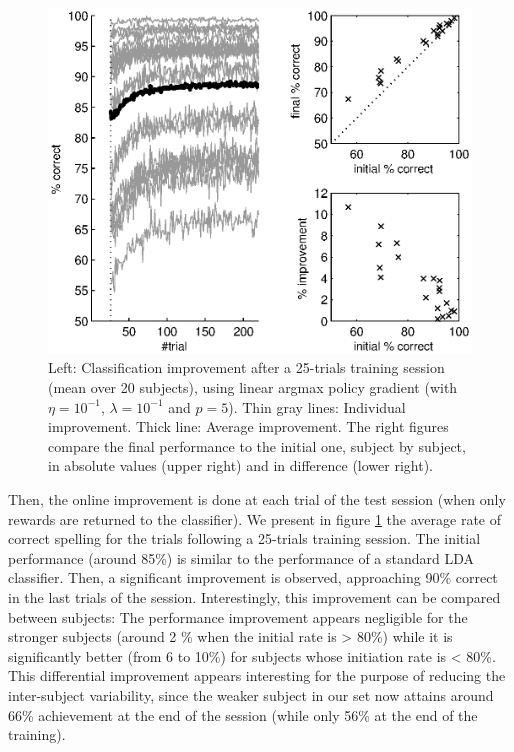 \documentclass[conference]{IEEEtran}
\begin{document}
\begin{figure}
\centerline{
 \includegraphics[width=\linewidth]{figs-copie/fig_filter_adapt}
}
\caption{Left: Classification improvement after a 25-trials training session (mean over 20 subjects), 
using linear argmax policy gradient (with $\eta = 10^{-1}$, $\lambda = 10^{-1}$ and $p=5$). 
Thin gray lines: Individual improvement. Thick line: Average improvement. The right figures compare the 
final performance to the initial one, subject by subject, in absolute values (upper right) and in
difference (lower right).}
\label{fig:filter_adapt}
\end{figure}

Then, the online improvement
is done at each trial of the test session (when only rewards are returned to the classifier).
We present in figure \ref{fig:filter_adapt} the average rate of correct spelling for the trials
following a 25-trials training session. The initial performance (around 85\%) is similar to 
the performance of a standard LDA classifier. Then, a significant improvement is observed, approaching
90\% correct in the last trials of the session.
Interestingly, this improvement can be compared between subjects: The performance improvement
appears negligible for the stronger subjects (around 2 \% when the initial rate is > 80\%) while it
is significantly better (from 6 to 10\%) for subjects whose initiation rate is < 80\%. 
This differential improvement appears interesting for the purpose of reducing the inter-subject
variability, since the weaker subject in our set now attains around 66\% achievement at the end of the session
(while only 56\% at the end of the training). 
\end{document}

